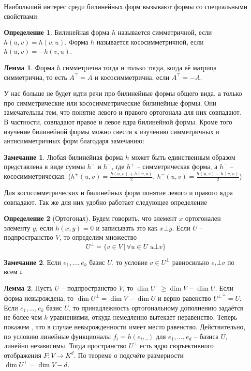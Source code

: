 \documentclass[10pt,a4paper,oneside]{book} %
\theoremstyle{definition}
\newtheorem*{rem}{Замечание}
\newtheorem*{defn}{Определение}
\newtheorem{lem}{Лемма}
\def\dfn{\begin{defn}}
\def\edfn{\end{defn}}
\def\lm{\begin{lem}}
\def\elm{\end{lem}}
\def\rm{\begin{rem}}
\def\erm{\end{rem}}
\begin{document}
Наибольший интерес среди билинейных форм вызывают формы со специальными свойствами:

\dfn Билинейная форма $h$ называется симметричной, если $h(u,v)=h(v,u)$. Форма $h$ называется кососимметричной, если $h(u,v)=-h(v,u)$.
\edfn

\lm  Форма $h$ симметрична тогда и только тогда, когда её матрица симметрична, то есть $A^{\top}=A$ и кососимметрична, если $A^{\top}=-A$.
\elm

У нас больше не будет идти речи про билинейные формы общего вида, а только про симметрические или кососимметрические билинейные формы. Они замечательны тем, что понятие левого и правого ортогонала для них совпадают. В частности, совпадают правое и левое ядра билинейной формы. Кроме того изучение билинейной формы можно свести к изучению симметричных и антисимметричных форм благодаря замечанию:

\rm Любая билинейная форма $h$ может быть единственным образом представлена в виде суммы $h^+$ и $h^-$, где $h^+$ -- симметрическая форма, а $h^-$ -- кососимметрическая. ($h^+(u,v)=\frac{h(u,v)+h(v,u)}{2}$, $h^-(u,v)=\frac{h(u,v)-h(v,u)}{2}$)
\erm




Для кососимметрических и билинейных форм понятие левого и правого ядра совпадают. Так же для них удобно работает  следующее определение

\dfn[Ортогонал] Будем говорить, что элемент $x$ ортогонален  элементу $y$, если $h(x,y)=0$ и записывать это как $x\bot y$. 
Если $U$ -- подпространство $V$, то определим множество $$U^{\bot}=\{v\in V\,|\, \forall u \in U \, \, u\bot v\}$$  
\edfn

\rm Если $e_1,\dots,e_k$ базис $U$, то условие $v\in U^{\bot}$ равносильно $e_i\bot v$ по всем $i$.
\erm



\lm Пусть $U$ -- подпространство $V$, то $\dim U^{\bot}\geq \dim V - \dim U$.
Если форма невырождена, то $\dim U^{\bot}= \dim V- \dim U$ и верно равенство ${U^{\bot}}^{\bot}=U$.
\proof Если $e_1,\dots,e_k$ базис $U$, то принадлежность ортогональному дополнению задаётся не более чем $k$ уравнениями, откуда немедленно вытекает неравенство. Теперь покажем , что в случае невырожденности имеет место равенство. Действительно, по условию линейные функционалы $f_i= h(e_i,\_)$ для $e_1,\dots, e_d$ -- базиса $U$, линейно независимы. Тогда пространство $U^{\bot}$ есть ядро сюръективного отображения $F \colon V \to K^d$. По теореме о подсчёте размерности $\dim U^{\bot}= \dim V - d$. 
\endproof 
\elm
\end{document}
